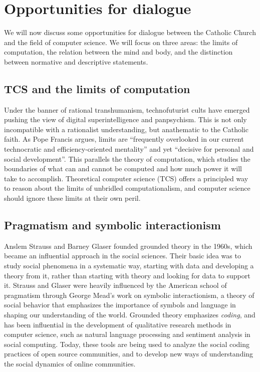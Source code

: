 \documentclass[sigplan,nonacm]{acmart}\settopmatter{printfolios=false,printccs=false,printacmref=false}
\begin{document}
  \section{Opportunities for dialogue}

  We will now discuss some opportunities for dialogue between the Catholic Church and the field of computer science. We will focus on three areas: the limits of computation, the relation between the mind and body, and the distinction between normative and descriptive statements.

  \subsection{TCS and the limits of computation}

  Under the banner of rational transhumanism, technofuturist cults have emerged pushing the view of digital superintelligence and panpsychism. This is not only incompatible with a rationalist understanding, but anathematic to the Catholic faith. As Pope Francis argues, limits are ``frequently overlooked in our current technocratic and efficiency-oriented mentality'' and yet ``decisive for personal and social development''. This parallels the theory of computation, which studies the boundaries of what can and cannot be computed and how much power it will take to accomplish. Theoretical computer science (TCS) offers a principled way to reason about the limits of unbridled computationalism, and computer science should ignore these limits at their own peril.


  \subsection{Pragmatism and symbolic interactionism}

  Anslem Strauss and Barney Glaser founded grounded theory in the 1960s, which became an influential approach in the social sciences. Their basic idea was to study social phenomena in a systematic way, starting with data and developing a theory from it, rather than starting with theory and looking for data to support it. Strauss and Glaser were heavily influenced by the American school of pragmatism through George Mead's work on symbolic interactionism, a theory of social behavior that emphasizes the importance of symbols and language in shaping our understanding of the world. Grounded theory emphasizes \textit{coding}, and has been influential in the development of qualitative research methods in computer science, such as natural language processing and sentiment analysis in social computing. Today, these tools are being used to analyze the social coding practices of open source communities, and to develop new ways of understanding the social dynamics of online communities.
\end{document}
